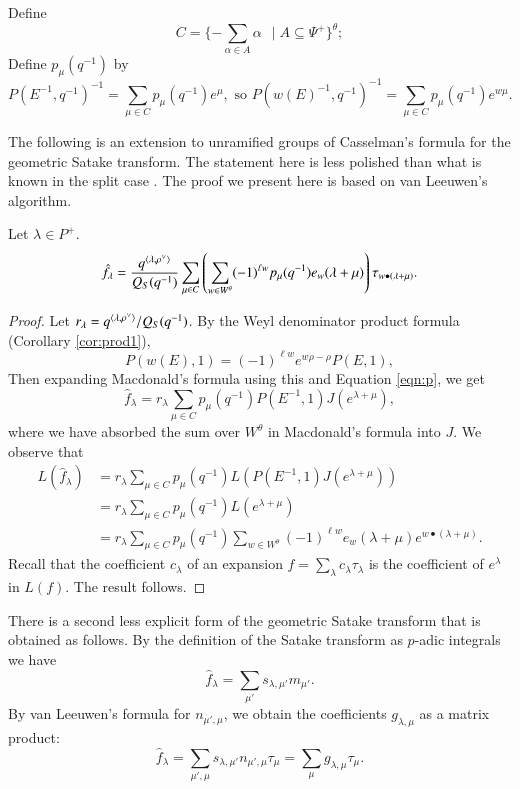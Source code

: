 Define
\[
C = \{  - \sum_{\alpha\in A}\alpha \ \ \mid A \subseteq \Psi^+ \}^\theta;
\]
Define $p_\mu(q^{-1})$ by
\begin{equation}\label{eqn:p}
 P(E^{-1},q^{-1})^{-1} = \sum_{\mu\in C} p_\mu(q^{-1}) e^{\mu},
\text{\ \ so }  P(w(E)^{-1},q^{-1})^{-1} = \sum_{\mu\in C} p_\mu(q^{-1}) e^{w\mu}.
\end{equation}

The following is an extension to unramified groups of Casselman's formula for the geometric Satake transform.
The statement here is less polished than what is known in the split case \cite{casymmetric}.
The proof we present here is based on van Leeuwen's algorithm.

\begin{theorem}  Let $\lambda\in P^+$.
\[
\hat f_\lambda = \frac{q^{\langle{\lambda,\rho^\vee}\rangle}}{Q_S(q^{-1})} 
\sum_{\mu\in C}\left(\sum_{w\in W^\theta} (-1)^{\ell w} p_{\mu}(q^{-1}) e_w(\lambda+\mu)\right)  \tau_{w\bullet(\lambda+\mu)}.
\]
\end{theorem}


\begin{proof}
Let $r_\lambda = q^{\langle{\lambda,\rho^\vee}\rangle}/Q_S(q^{-1})$.
By the Weyl denominator product formula (Corollary \ref{cor:prod1}),
\begin{equation}
P(w(E),1) = (-1)^{\ell w} e^{w\rho - \rho} P(E,1),
\end{equation}
Then expanding Macdonald's formula using this and Equation \ref{eqn:p}, we get
\[
\hat f_\lambda = r_\lambda \sum_{\mu\in C} p_\mu(q^{-1}) P(E^{-1},1) J (e^{\lambda+\mu}),
\]
where we have absorbed the sum over $W^\theta$ in Macdonald's formula into $J$.
We observe that 
\begin{align*}
L(\hat f_\lambda) &= r_\lambda \sum_{\mu\in C} p_\mu(q^{-1}) L(P(E^{-1},1) J(e^{\lambda+\mu})) \\
&= 
r_\lambda \sum_{\mu\in C} p_\mu(q^{-1}) L(e^{\lambda+\mu}) \\
&= 
r_\lambda
\sum_{\mu\in C} p_\mu(q^{-1}) \sum_{w\in W^\theta} (-1)^{\ell w} e_w(\lambda+\mu) e^{w\bullet (\lambda+\mu)}.
\end{align*}
Recall that the coefficient $c_\lambda$ of an expansion $f = \sum_\lambda c_\lambda\tau_\lambda$ 
is the coefficient of $e^\lambda$ in $L(f)$.  The result follows.
\end{proof}

There is a second less explicit form of the geometric Satake transform that is obtained as follows.
By the definition of the Satake transform as $p$-adic integrals we have
\[
\hat f_\lambda = \sum_{\mu'} s_{\lambda,\mu'} m_{\mu'}.
\]
By van Leeuwen's formula for $n_{\mu',\mu}$, 
we obtain the coefficients $g_{\lambda,\mu}$ as a matrix product:
\begin{equation}
\hat f_\lambda = \sum_{\mu',\mu} s_{\lambda,\mu'} n_{\mu',\mu} \tau_{\mu} = \sum_{\mu} g_{\lambda,\mu} \tau_\mu.
\end{equation}


